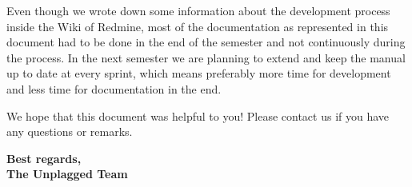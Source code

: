 Even though we wrote down some information about the development process inside the Wiki of Redmine, most of the 
documentation as 
represented in this document had to be 
done in the end of the semester and not continuously during the process. 
In the next semester we are planning to extend and keep the manual up to date at every sprint, which means preferably 
more time for development and less time for documentation in the end.

We hope that this document was helpful to you! Please contact us if you have any questions or remarks.

\large 
\textbf{Best regards, \\
The Unplagged Team}